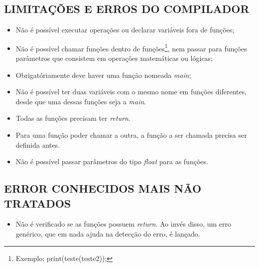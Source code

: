 	\subsection{\normalsize LIMITAÇÕES E ERROS DO COMPILADOR}
	\begin{itemize}
		\item Não é possível executar operações ou declarar variáveis fora de funções;
		\item Não é possível chamar funções dentro de funções\footnote{Exemplo: print(teste(teste2));}, nem passar para funções parâmetros que consistem em operações matemáticas ou lógicas;
		\item Obrigatóriamente deve haver uma função nomeada \textit{main};
		\item Não é possível ter duas variáveis com o mesmo nome em funções diferentes, desde que uma dessas funções seja a \textit{main}.
		\item Todas as funções precisam ter \textit{return}.
		\item Para uma função poder chamar a outra, a função a ser chamada precisa ser definida antes.
		\item Não é possível passar parâmetros do tipo \textit{float} para as funções.
	\end{itemize}
	
	\subsection{\normalsize ERROR CONHECIDOS MAIS NÃO TRATADOS}
	\begin{itemize}
		\item Não é verificado se as funções possuem \textit{return}. Ao invés disso, um erro genérico, que em nada ajuda na detecção do erro, é lançado.
	\end{itemize}